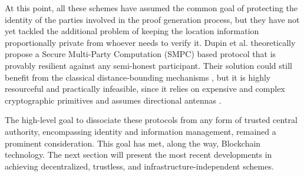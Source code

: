 At this point, all these schemes have assumed the common goal of protecting the identity of the parties involved in the proof generation process, but they have not yet tackled the additional problem of keeping the location information proportionally private from whoever needs to verify it. Dupin et al. \cite{dupin2018location} theoretically propose a Secure Multi-Party Computation (SMPC) based protocol that is provably resilient against any semi-honest participant. Their solution could still benefit from the classical distance-bounding mechanisms \cite{dupin2018location}, but it is highly resourceful and practically infeasible, since it relies on expensive and complex cryptographic primitives and assumes directional antennas \cite{yang2021group}.

The high-level goal to dissociate these \pol{} protocols from any form of trusted central authority, encompassing identity and information management, remained a prominent consideration. This goal has met, along the way, Blockchain technology. The next section will present the most recent developments in achieving decentralized, trustless, and infrastructure-independent \pol{} schemes.
